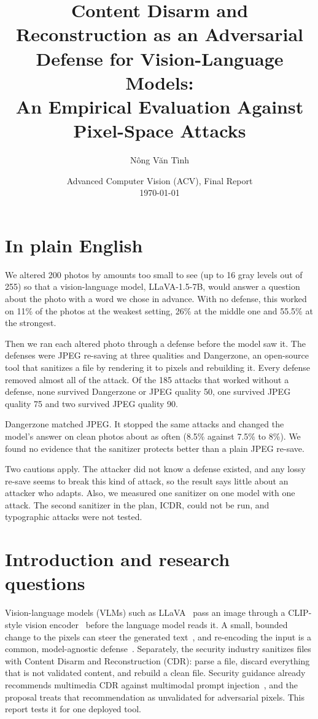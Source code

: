 \documentclass[11pt]{article}
\title{\vspace{-2.2em}\textbf{Content Disarm and Reconstruction as an
Adversarial Defense for Vision-Language Models:\\
An Empirical Evaluation Against Pixel-Space Attacks}}
\author{Nông Văn Tình}
\date{Advanced Computer Vision (ACV), Final Report \\ \today}
\begin{document}
\maketitle
\vspace{-1.2em}

\section*{In plain English}

We altered 200 photos by amounts too small to see (up to 16 gray levels out of 255)
so that a vision-language model, LLaVA-1.5-7B, would answer a question about the photo
with a word we chose in advance. With no defense, this worked on 11\% of the photos at
the weakest setting, 26\% at the middle one and 55.5\% at the strongest.

Then we ran each altered photo through a defense before the model saw it. The defenses
were JPEG re-saving at three qualities and Dangerzone, an open-source tool that
sanitizes a file by rendering it to pixels and rebuilding it. Every defense removed
almost all of the attack. Of the 185 attacks that worked without a defense, none
survived Dangerzone or JPEG quality 50, one survived JPEG quality 75 and two survived
JPEG quality 90.

Dangerzone matched JPEG. It stopped the same attacks and changed the model's answer on
clean photos about as often (8.5\% against 7.5\% to 8\%). We found no evidence that the
sanitizer protects better than a plain JPEG re-save.

Two cautions apply. The attacker did not know a defense existed, and any lossy re-save
seems to break this kind of attack, so the result says little about an attacker who
adapts. Also, we measured one sanitizer on one model with one attack. The second
sanitizer in the plan, ICDR, could not be run, and typographic attacks were not tested.

\section{Introduction and research questions}

Vision-language models (VLMs) such as LLaVA~\cite{liu2023llava} pass an image through a
CLIP-style vision encoder~\cite{radford2021clip} before the language model reads it. A
small, bounded change to the pixels can steer the generated text~\cite{qi2024visualaaai},
and re-encoding the input is a common, model-agnostic defense~\cite{guo2018countering}.
Separately, the security industry sanitizes files with Content Disarm and Reconstruction
(CDR): parse a file, discard everything that is not validated content, and rebuild a
clean file. Security guidance already recommends multimedia CDR against multimodal
prompt injection~\cite{safm49}, and the proposal treats that recommendation as
unvalidated for adversarial pixels. This report tests it for one deployed tool.
\end{document}
